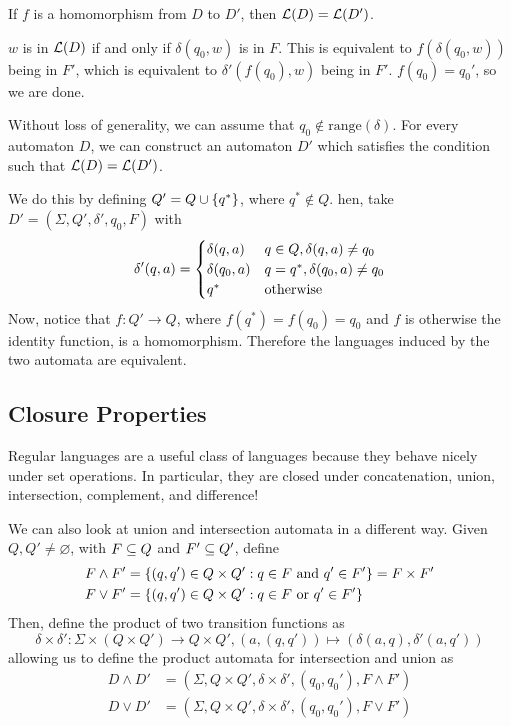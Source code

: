 \documentclass{article}
\begin{document}
\begin{proposition}
	\label{homomorphic-automata-equivalent}
	If $f$ is a homomorphism from $D$ to $D'$, then $\mathcal{L}(D) = \mathcal{L}(D')$.
\end{proposition}

\begin{prf}
	$w$ is in $\mathcal{L}(D)$ if and only if $\delta(q_0, w)$ is in $F$. This is equivalent to $f(\delta(q_0, w))$ being in $F'$, which is equivalent to $\delta'(f(q_0), w)$ being in $F'$. $f(q_0) = q_0'$, so we are done.
\end{prf}

Without loss of generality, we can assume that $q_0 \notin \mathrm{range}(\delta)$. For every automaton $D$, we can construct an automaton $D'$ which satisfies the condition such that $\mathcal{L}(D) = \mathcal{L}(D')$.

We do this by defining $Q' = Q \cup \left\lbrace q^* \right\rbrace$, where $q^* \notin Q$. hen, take $D' = (\Sigma, Q', \delta', q_0, F)$ with
\[
	\delta'(q, a) = \begin{cases}
	\delta(q, a) & q \in Q, \delta(q, a) \neq q_0 \\
	\delta(q_0, a) & q = q^*, \delta(q_0, a) \neq q_0 \\
	q^* & \!\mathrel{\, \text{otherwise}}
	\end{cases}
\]
Now, notice that $f: Q' \to Q$, where $f(q^*) = f(q_0) = q_0$ and $f$ is otherwise the identity function, is a homomorphism. Therefore the languages induced by the two automata are equivalent.

\subsection{Closure Properties}

Regular languages are a useful class of languages because they behave nicely under set operations. In particular, they are closed under concatenation, union, intersection, complement, and difference!

We can also look at union and intersection automata in a different way. Given $Q, Q' \neq \varnothing$, with $F \subseteq Q$ and $F' \subseteq Q'$, define
\begin{align*}
	F \land F' & = \left\lbrace (q, q') \in Q \times Q': q \in F \text{ and } q' \in F' \right\rbrace = F \times F' \\
	F \lor F'  & = \left\lbrace (q, q') \in Q \times Q': q \in F \text{ or } q' \in F' \right\rbrace                
\end{align*}
Then, define the product of two transition functions as
\[
	\delta \times \delta' : \Sigma \times (Q \times Q') \to Q \times Q', (a, (q, q')) \mapsto (\delta(a, q), \delta'(a, q'))
\]
allowing us to define the product automata for intersection and union as
\begin{align*}
	D \land D' & = (\Sigma, Q \times Q', \delta \times \delta', (q_0, q_0'), F \land F') \\
	D \lor D'  & = (\Sigma, Q \times Q', \delta \times \delta', (q_0, q_0'), F \lor F')  
\end{align*}
\end{document}
